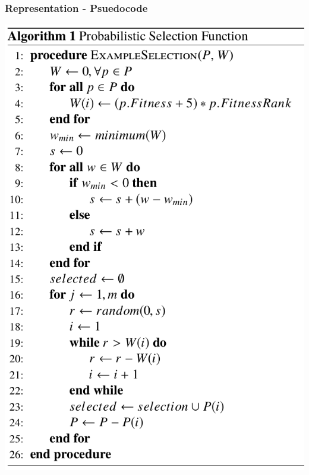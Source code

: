 \documentclass{beamer}
\begin{document}
	\begin{frame}
		\frametitle{Representation - Psuedocode}
		\centering
		\includegraphics[height=0.8\paperheight]{example_eppsea_code}
	\end{frame}
	
\end{document}
